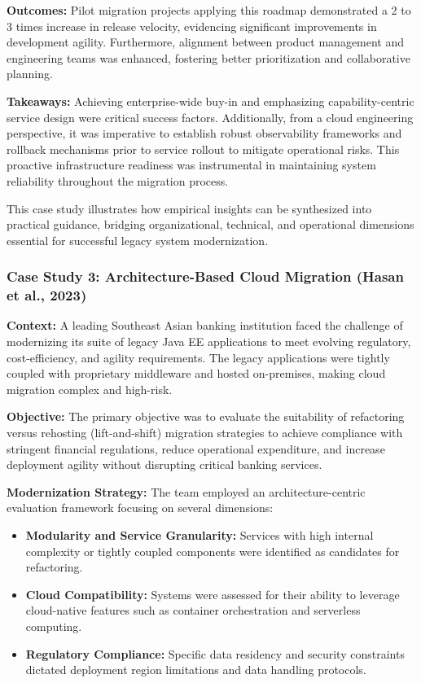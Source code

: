 \documentclass[12pt]{article}
\begin{document}
\textbf{Outcomes:}  
Pilot migration projects applying this roadmap demonstrated a 2 to 3 times increase in release velocity, evidencing significant improvements in development agility. Furthermore, alignment between product management and engineering teams was enhanced, fostering better prioritization and collaborative planning.

\textbf{Takeaways:}  
Achieving enterprise-wide buy-in and emphasizing capability-centric service design were critical success factors. Additionally, from a cloud engineering perspective, it was imperative to establish robust observability frameworks and rollback mechanisms prior to service rollout to mitigate operational risks. This proactive infrastructure readiness was instrumental in maintaining system reliability throughout the migration process.

This case study illustrates how empirical insights can be synthesized into practical guidance, bridging organizational, technical, and operational dimensions essential for successful legacy system modernization.


\vspace{0.5cm}

\subsubsection{Case Study 3: Architecture-Based Cloud Migration (Hasan et al., 2023)}

\textbf{Context:}  
A leading Southeast Asian banking institution faced the challenge of modernizing its suite of legacy Java EE applications to meet evolving regulatory, cost-efficiency, and agility requirements. The legacy applications were tightly coupled with proprietary middleware and hosted on-premises, making cloud migration complex and high-risk.

\textbf{Objective:}  
The primary objective was to evaluate the suitability of refactoring versus rehosting (lift-and-shift) migration strategies to achieve compliance with stringent financial regulations, reduce operational expenditure, and increase deployment agility without disrupting critical banking services.

\textbf{Modernization Strategy:}  
The team employed an architecture-centric evaluation framework focusing on several dimensions:

\begin{itemize}
    \item \textbf{Modularity and Service Granularity:} Services with high internal complexity or tightly coupled components were identified as candidates for refactoring.
    \item \textbf{Cloud Compatibility:} Systems were assessed for their ability to leverage cloud-native features such as container orchestration and serverless computing.
    \item \textbf{Regulatory Compliance:} Specific data residency and security constraints dictated deployment region limitations and data handling protocols.
\end{itemize}
\end{document}
